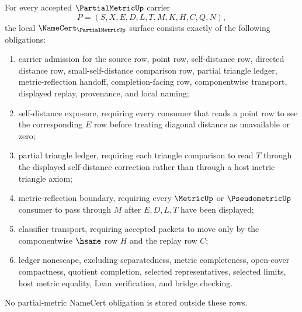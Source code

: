 \begin{theorem}
\label{thm:partial-metric-namecert-obligations}
For every accepted $\PartialMetricUp$ carrier
$$
P=(S,X,E,D,L,T,M,K,H,C,Q,N),
$$
the local $\NameCert_{\PartialMetricUp}$ surface consists exactly of the following obligations:
\begin{enumerate}
\item carrier admission for the source row, point row, self-distance row, directed distance row, small-self-distance comparison row, partial triangle ledger, metric-reflection handoff, completion-facing row, componentwise transport, displayed replay, provenance, and local naming;
\item self-distance exposure, requiring every consumer that reads a point row to see the corresponding $E$ row before treating diagonal distance as unavailable or zero;
\item partial triangle ledger, requiring each triangle comparison to read $T$ through the displayed self-distance correction rather than through a host metric triangle axiom;
\item metric-reflection boundary, requiring every $\MetricUp$ or $\PseudometricUp$ consumer to pass through $M$ after $E,D,L,T$ have been displayed;
\item classifier transport, requiring accepted packets to move only by the componentwise $\hsame$ row $H$ and the replay row $C$;
\item ledger nonescape, excluding separatedness, metric completeness, open-cover compactness, quotient completion, selected representatives, selected limits, host metric equality, Lean verification, and bridge checking.
\end{enumerate}
No partial-metric NameCert obligation is stored outside these rows.
\end{theorem}
